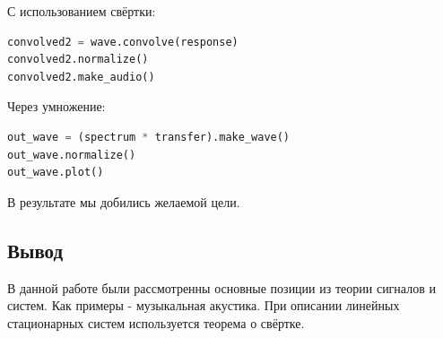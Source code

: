 С использованием свёртки:
\begin{lstlisting}[language=Python]
convolved2 = wave.convolve(response)
convolved2.normalize()
convolved2.make_audio()
\end{lstlisting}

Через умножение:
\begin{lstlisting}[language=Python]
out_wave = (spectrum * transfer).make_wave()
out_wave.normalize()
out_wave.plot()
\end{lstlisting}

В результате мы добились желаемой цели.


\subsection{Вывод}

В данной работе были рассмотренны основные позиции из теории сигналов и систем. Как примеры - музыкальная акустика. При описании линейных стационарных систем используется теорема о свёртке.